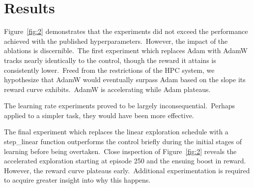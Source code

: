 \documentclass[conference]{./IEEEtran/IEEEtran} %
\begin{document}
    \section{Results}\label{sec:results}
    Figure~\ref{fig:2} demonstrates that the experiments did not exceed the performance achieved with the published
    hyperparameters.\ However, the impact of the ablations is discernible.\ The first experiment which replaces Adam
    with AdamW tracks nearly identically to the control, though the reward it attains is consistently lower.\ Freed from
    the restrictions of the HPC system, we hypothesize that AdamW would eventually surpass Adam based on the slope its
    reward curve exhibits.\ AdamW is accelerating while Adam plateaus.

    The learning rate experiments proved to be largely inconsequential.\ Perhaps applied to a simpler task, they would
    have been more effective.

    The final experiment which replaces the linear exploration schedule with a step\_linear function outperforms the
    control briefly during the initial stages of learning before being overtaken.\ Close inspection of
    Figure~\ref{fig:2} reveals the accelerated exploration starting at episode 250 and the ensuing boost in reward.
    However, the reward curve plateaus early.\ Additional experimentation is required to acquire greater insight into
    why this happens.
\end{document}
